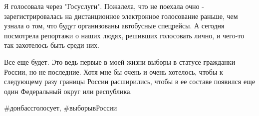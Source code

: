 Я голосовала через "Госуслуги". Пожалела, что не поехала очно -
зарегистрировалась на дистанционное электронное голосование раньше, чем узнала
о том, что будут организованы автобусные спецрейсы. А сегодня посмотрела
репортажи о наших людях, решивших голосовать лично, и чего-то так захотелось
быть среди них. 

Все еще будет. Это ведь первые в моей жизни выборы в статусе гражданки России,
но не последние. Хотя мне бы очень и очень хотелось, чтобы к следующему разу
границы России расширились, чтобы в ее составе появился еще один Федеральный
округ или республика. 

\#донбассголосует, \#выборывРоссии
